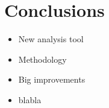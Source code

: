\section{Conclusions}
\label{sec:concl}

\begin{itemize}
    \item New analysis tool
    \item Methodology
    \item Big improvements
    \item blabla
\end{itemize}
